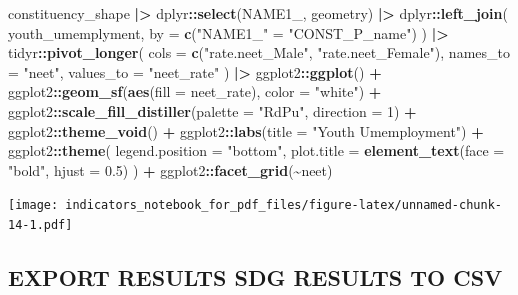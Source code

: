 \documentclass[
]{article}
\newenvironment{Shaded}{\begin{snugshade}}{\end{snugshade}}
\newcommand{\AttributeTok}[1]{\textcolor[rgb]{0.13,0.29,0.53}{#1}}
\newcommand{\DecValTok}[1]{\textcolor[rgb]{0.00,0.00,0.81}{#1}}
\newcommand{\FloatTok}[1]{\textcolor[rgb]{0.00,0.00,0.81}{#1}}
\newcommand{\FunctionTok}[1]{\textcolor[rgb]{0.13,0.29,0.53}{\textbf{#1}}}
\newcommand{\NormalTok}[1]{#1}
\newcommand{\OtherTok}[1]{\textcolor[rgb]{0.56,0.35,0.01}{#1}}
\newcommand{\SpecialCharTok}[1]{\textcolor[rgb]{0.81,0.36,0.00}{\textbf{#1}}}
\newcommand{\StringTok}[1]{\textcolor[rgb]{0.31,0.60,0.02}{#1}}
\newenvironment{UNFPAShadedBox}{%
\begin{tcolorbox}[sharp corners, enhanced, colback=white, boxrule=0pt, borderline west={2pt}{0pt}{orange}]%
}{\end{tcolorbox}}
\newenvironment{Highlighting}{\begin{UNFPAShadedBox}}{\end{UNFPAShadedBox}}
\begin{document}
\begin{Shaded}
\begin{Highlighting}[]
\NormalTok{constituency\_shape }\SpecialCharTok{|\textgreater{}}
\NormalTok{  dplyr}\SpecialCharTok{::}\FunctionTok{select}\NormalTok{(NAME1\_, geometry) }\SpecialCharTok{|\textgreater{}}
\NormalTok{  dplyr}\SpecialCharTok{::}\FunctionTok{left\_join}\NormalTok{(}
\NormalTok{    youth\_umemplyment,}
    \AttributeTok{by =} \FunctionTok{c}\NormalTok{(}\StringTok{"NAME1\_"} \OtherTok{=} \StringTok{"CONST\_P\_name"}\NormalTok{)}
\NormalTok{  ) }\SpecialCharTok{|\textgreater{}}
\NormalTok{  tidyr}\SpecialCharTok{::}\FunctionTok{pivot\_longer}\NormalTok{(}
    \AttributeTok{cols =} \FunctionTok{c}\NormalTok{(}\StringTok{"rate.neet\_Male"}\NormalTok{, }\StringTok{"rate.neet\_Female"}\NormalTok{),}
    \AttributeTok{names\_to =} \StringTok{"neet"}\NormalTok{,}
    \AttributeTok{values\_to =} \StringTok{"neet\_rate"}
\NormalTok{  ) }\SpecialCharTok{|\textgreater{}}
\NormalTok{  ggplot2}\SpecialCharTok{::}\FunctionTok{ggplot}\NormalTok{() }\SpecialCharTok{+}
\NormalTok{  ggplot2}\SpecialCharTok{::}\FunctionTok{geom\_sf}\NormalTok{(}\FunctionTok{aes}\NormalTok{(}\AttributeTok{fill =}\NormalTok{ neet\_rate), }\AttributeTok{color =} \StringTok{"white"}\NormalTok{) }\SpecialCharTok{+}
\NormalTok{  ggplot2}\SpecialCharTok{::}\FunctionTok{scale\_fill\_distiller}\NormalTok{(}\AttributeTok{palette =} \StringTok{"RdPu"}\NormalTok{, }\AttributeTok{direction =} \DecValTok{1}\NormalTok{) }\SpecialCharTok{+}
\NormalTok{  ggplot2}\SpecialCharTok{::}\FunctionTok{theme\_void}\NormalTok{() }\SpecialCharTok{+}
\NormalTok{  ggplot2}\SpecialCharTok{::}\FunctionTok{labs}\NormalTok{(}\AttributeTok{title =} \StringTok{"Youth Umemployment"}\NormalTok{) }\SpecialCharTok{+}
\NormalTok{  ggplot2}\SpecialCharTok{::}\FunctionTok{theme}\NormalTok{(}
    \AttributeTok{legend.position =} \StringTok{"bottom"}\NormalTok{,}
    \AttributeTok{plot.title =} \FunctionTok{element\_text}\NormalTok{(}\AttributeTok{face =} \StringTok{"bold"}\NormalTok{, }\AttributeTok{hjust =} \FloatTok{0.5}\NormalTok{)}
\NormalTok{  ) }\SpecialCharTok{+}
\NormalTok{  ggplot2}\SpecialCharTok{::}\FunctionTok{facet\_grid}\NormalTok{(}\SpecialCharTok{\textasciitilde{}}\NormalTok{neet)}
\end{Highlighting}
\end{Shaded}

\texttt{[image: indicators\_notebook\_for\_pdf\_files/figure-latex/unnamed-chunk-14-1.pdf]}

\subsection{EXPORT RESULTS SDG RESULTS TO
CSV}\label{export-results-sdg-results-to-csv}
\end{document}
